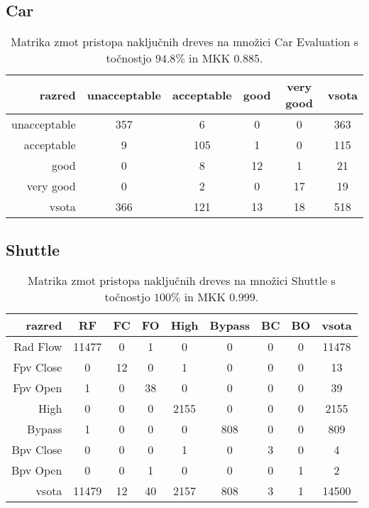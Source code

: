 \subsection{Car}\label{subsec:random-forest-car-test}
\begin{table}[H]
    \centering
    \begin{tabular}{||rccccc||}
        \hline
        razred       & unacceptable & acceptable & good & very good & vsota \\ \hline
        unacceptable & 357          & 6          & 0    & 0         & 363   \\ \hline
        acceptable   & 9            & 105        & 1    & 0         & 115   \\ \hline
        good         & 0            & 8          & 12   & 1         & 21    \\ \hline
        very good    & 0            & 2          & 0    & 17        & 19    \\ \hline
        vsota        & 366          & 121        & 13   & 18        & 518   \\ \hline
    \end{tabular}
    \caption{Matrika zmot pristopa naključnih dreves na množici Car Evaluation s točnostjo $94.8\%$ in MKK $0.885$.}
    \label{tab:rforest_car_cm}
\end{table}

\subsection{Shuttle}\label{subsec:random-forest-shuttle-test}
\begin{table}[H]
    \centering
    \begin{tabular}{||rcccccccc||}
        \hline
        razred    & RF    & FC & FO & High & Bypass & BC & BO & vsota \\ \hline
        Rad Flow  & 11477 & 0  & 1  & 0    & 0      & 0  & 0  & 11478 \\ \hline
        Fpv Close & 0     & 12 & 0  & 1    & 0      & 0  & 0  & 13    \\ \hline
        Fpv Open  & 1     & 0  & 38 & 0    & 0      & 0  & 0  & 39    \\ \hline
        High      & 0     & 0  & 0  & 2155 & 0      & 0  & 0  & 2155  \\ \hline
        Bypass    & 1     & 0  & 0  & 0    & 808    & 0  & 0  & 809   \\ \hline
        Bpv Close & 0     & 0  & 0  & 1    & 0      & 3  & 0  & 4     \\ \hline
        Bpv Open  & 0     & 0  & 1  & 0    & 0      & 0  & 1  & 2     \\ \hline
        vsota     & 11479 & 12 & 40 & 2157 & 808    & 3  & 1  & 14500 \\ \hline
    \end{tabular}
    \caption{Matrika zmot pristopa naključnih dreves na množici Shuttle s točnostjo $100\%$ in MKK $0.999$.}
    \label{tab:rforest_shuttle_cm}
\end{table}